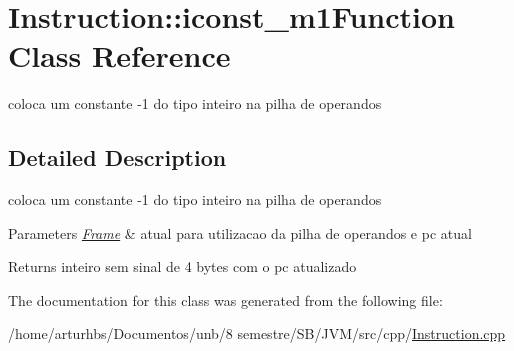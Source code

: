 \hypertarget{classInstruction_1_1iconst__m1Function}{}\section{Instruction\+:\+:iconst\+\_\+m1\+Function Class Reference}
\label{classInstruction_1_1iconst__m1Function}


coloca um constante -\/1 do tipo inteiro na pilha de operandos  




\subsection{Detailed Description}
coloca um constante -\/1 do tipo inteiro na pilha de operandos 


\begin{DoxyParams}{Parameters}
{\em \hyperlink{classFrame}{Frame}} & atual para utilizacao da pilha de operandos e pc atual \\
\hline
\end{DoxyParams}
\begin{DoxyReturn}{Returns}
inteiro sem sinal de 4 bytes com o pc atualizado 
\end{DoxyReturn}


The documentation for this class was generated from the following file\+:\begin{DoxyCompactItemize}
\item 
/home/arturhbs/\+Documentos/unb/8 semestre/\+S\+B/\+J\+V\+M/src/cpp/\hyperlink{Instruction_8cpp}{Instruction.\+cpp}\end{DoxyCompactItemize}
